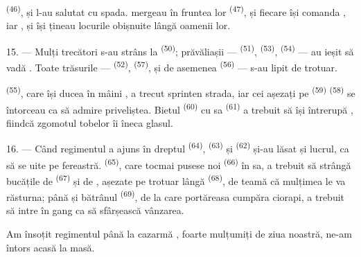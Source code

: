  \textsuperscript{(46)},  și
 l-au salutat cu spada.  mergeau în
fruntea  lor \textsuperscript{(47)}, și fiecare
 își comanda , iar ,
 și  își țineau locurile obișnuite
lângă oamenii lor.

15. --- Mulți trecători s-au strâns la  \textsuperscript{(50)};
prăvăliașii ---  \textsuperscript{(51)},
 \textsuperscript{(53)}, 
\textsuperscript{(54)} --- au ieșit să vadă . Toate trăsurile ---
 \textsuperscript{(52)}, 
\textsuperscript{(57)}, și de asemenea 
\textsuperscript{(56)} --- s-au lipit de trotuar.

\VUsaut{3.0mm}

 \textsuperscript{(55)}, care își ducea în mâini
, a trecut sprinten strada, iar cei așezați pe
 \textsuperscript{(59)} 
\textsuperscript{(58)} se întorceau ca să admire priveliștea. Bietul  \textsuperscript{(60)} cu  sa \textsuperscript{(61)} a
trebuit să își întrerupă , fiindcă zgomotul tobelor îi îneca glasul.

16. --- Când regimentul a ajuns în dreptul 
\textsuperscript{(64)},  \textsuperscript{(63)} și
 \textsuperscript{(62)} și-au lăsat  și
lucrul, ca să se uite pe fereastră.  \textsuperscript{(65)},
care tocmai pusese  noi \textsuperscript{(66)} în 
sa, a trebuit să strângă bucățile de  \textsuperscript{(67)} și de
, așezate pe trotuar lângă  \textsuperscript{(68)}, de
teamă că mulțimea le va răsturna; până și bătrânul 
\textsuperscript{(69)}, de la care portăreasa cumpăra ciorapi, a trebuit să intre în
gang ca să sfârșească vânzarea.

Am însoțit regimentul până la cazarmă , foarte mulțumiți de ziua noastră,
ne-am întors acasă la masă.

